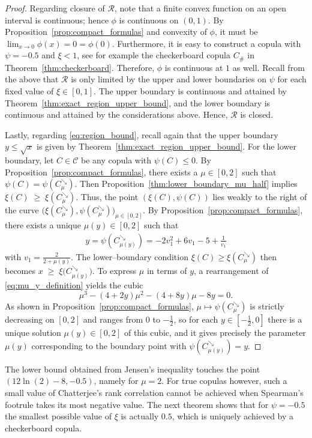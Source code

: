 \documentclass{article}
\newcommand{\1}{\mathds{1}}
\newcommand{\CC}{\mathcal{C}}  %
\begin{document}
\begin{proof}
Regarding closure of $\mathcal R$, note that a finite convex function on an open interval is continuous; hence $\phi$ is continuous on $(0,1)$.
By Proposition~\ref{prop:compact_formulas} and convexity of $\phi$, it must be $\lim_{x\to0}\phi(x)=0=\phi(0)$.
Furthermore, it is easy to construct a copula with $\psi=-0.5$ and $\xi<1$, see for example the checkerboard copula $C_\#$ in Theorem~\ref{thm:checkerboard}.
Therefore, $\phi$ is continuous at $1$ as well.
Recall from the above that $\mathcal{R}$ is only limited by the upper and lower boundaries on $\psi$ for each fixed value of $\xi\in[0,1]$.
The upper boundary is continuous and attained by Theorem~\ref{thm:exact_region_upper_bound}, and the lower boundary is continuous and attained by the considerations above.
Hence, $\mathcal R$ is closed.

Lastly, regarding \eqref{eq:region_bound}, recall again that the upper boundary $y \le \sqrt{x}$ is given by Theorem~\ref{thm:exact_region_upper_bound}.
For the lower boundary, let $C \in \CC$ be any copula with $\psi(C) \le 0$.
By Proposition~\ref{prop:compact_formulas}, there exists a $\mu \in [0,2]$ such that 
\(
  \psi(C) = \psi(C^{\searrow}_\mu).
\)
Then Proposition~\ref{thm:lower_boundary_mu_half} implies
\(
  \xi(C) \;\ge\; \xi(C^{\searrow}_\mu).
\)
Thus, the point $(\xi(C), \psi(C))$ lies weakly to the right of the curve 
\(
\bigl(\xi(C^{\searrow}_\mu), \psi(C^{\searrow}_\mu)\bigr)_{\mu\in[0,2]}.
\)
By Proposition~\ref{prop:compact_formulas}, there exists a unique $\mu(y)\in[0,2]$ such that
\begin{align}\label{eq:mu_y_definition}
   y 
   = \psi(C^{\searrow}_{\mu(y)})
   = -2v_1^2+6v_1-5+\frac{1}{v_1}
\end{align}
with \(v_1 = \frac{2}{2+\mu(y)}\).
The lower–boundary condition $\xi(C) \ge \xi(C^{\searrow}_\mu)$ then becomes
\(
   x \;\ge\; \xi\bigl(C^{\searrow}_{\mu(y)}\bigr).
\)
To express $\mu$ in terms of $y$, a rearrangement of \eqref{eq:mu_y_definition} yields the cubic
\[
\mu^3-(4+2y)\mu^2-(4+8y)\mu-8y=0.
\]
As shown in Proposition~\ref{prop:compact_formulas}, \(\mu\mapsto \psi(C^{\searrow}_\mu)\) is strictly decreasing on \([0,2]\) and ranges from \(0\) to \(-\tfrac12\), so for each \(y\in[-\tfrac12,0]\) there is a unique solution \(\mu(y)\in[0,2]\) of this cubic, and it gives precisely the parameter $\mu(y)$ corresponding to the boundary point with $\psi(C^{\searrow}_{\mu(y)})=y$.
\end{proof}

The lower bound obtained from Jensen's inequality touches the point $(12\ln(2)-8, -0.5)$, namely for $\mu=2$.
For true copulas however, such a small value of Chatterjee's rank correlation cannot be achieved when Spearman's footrule takes its most negative value.
The next theorem shows that for $\psi=-0.5$ the smallest possible value of $\xi$ is actually $0.5$, which is uniquely achieved by a checkerboard copula.
\end{document}
